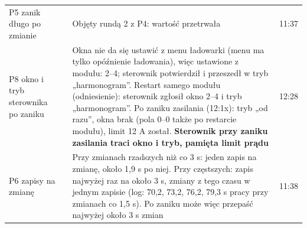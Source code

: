 \documentclass[11pt,a4paper]{article}
\begin{document}
\begin{longtable}{>{\raggedright\arraybackslash}p{3.01cm}>{\raggedright\arraybackslash}p{1.82cm}>{\raggedright\arraybackslash}p{8.56cm}>{\raggedright\arraybackslash}p{1.44cm}}
P5 zanik długo po zmianie & \leavevmode{\symbolfont\color{apgreen}\textbf{✔}} & Objęty rundą 2 z P4: wartość przetrwała & 30.09 11:37 \\
P8 okno i tryb sterownika po zaniku & \leavevmode{\symbolfont\color{apgreen}\textbf{✔}} & Okna nie da się ustawić z menu ładowarki (menu ma tylko opóźnienie ładowania), więc ustawione z modułu: 2–4; sterownik potwierdził i przeszedł w tryb „harmonogram”. Restart samego modułu (odniesienie): sterownik zgłosił okno 2–4 i tryb „harmonogram”. Po zaniku zasilania (12:1x): tryb „od razu”, okna brak (pola 0–0 także po restarcie modułu), limit 12 A został. \textbf{Sterownik przy zaniku zasilania traci okno i tryb, pamięta limit prądu} & 30.09 12:28 \\
P6 zapisy na zmianę & \leavevmode{\symbolfont\color{apgreen}\textbf{✔}} & Przy zmianach rzadszych niż co 3 s: jeden zapis na zmianę, około 1,9 s po niej. Przy częstszych: zapis najwyżej raz na około 3 s, zmiany z tego czasu w jednym zapisie (log: 70,2, 73,2, 76,2, 79,3 s pracy przy zmianach co 1,5 s). Po zaniku może więc przepaść najwyżej około 3 s zmian & 30.09 11:38 \\
\end{longtable}
\end{document}

